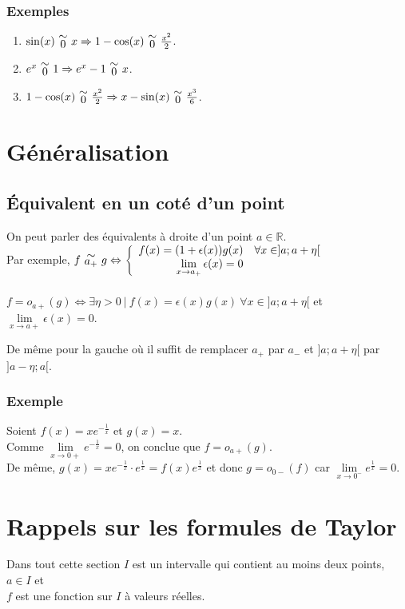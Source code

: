 \documentclass[a4paper,10pt]{book} %
\newcommand{\R}{\mathbb{R}}
\newcommand{\equi}[1]{\renewcommand{\arraystretch}{0.3}~\begin{matrix}\sim\\#1\end{matrix}~\renewcommand{\arraystretch}{1}}
\newcommand{\tq}{~|~}
\begin{document}
\subsubsection{Exemples}
\begin{enumerate}
\item $\sin(x)\equi{0} x\Rightarrow 1-\cos(x)\equi{0}\frac{x^2}{2}$.
\item $e^x\equi{0}1 \Rightarrow e^x-1\equi{0}x$.
\item $1-\cos(x)\equi{0}\frac{x^2}{2}\Rightarrow x-\sin(x)\equi{0}\frac{x^3}{6}$.
\end{enumerate}

\section{Généralisation}
\subsection{Équivalent en un coté d'un point}
On peut parler des équivalents à droite d'un point $a\in \R$.\\

Par exemple, $f\equi{a_+}g\Leftrightarrow \left\{\begin{array}{rcl}f(x)=(1+\epsilon(x))g(x) & \forall x\in ]a; a+\eta[ \\ \lim\limits_{x\rightarrow a_+}\epsilon(x)=0\end{array}\right.$\\\\

$f=o_{a+}(g)\Leftrightarrow\exists \eta>0 \tq f(x)=\epsilon(x)g(x) ~\forall x\in ]a; a+\eta[$ et $\lim\limits_{x\rightarrow a+}\epsilon(x)=0$.

De même pour la gauche où il suffit de remplacer $a_+$ par $a_-$ et $]a;a+\eta[$ par $]a-\eta; a[$.

\subsubsection{Exemple}
Soient $f(x)=xe^{-\frac{1}{x}}$ et $g(x)=x$.\\
Comme $\lim\limits_{x\rightarrow0+}e^{-\frac{1}{x}}=0$, on conclue que $f=o_{a+}(g)$.\\
De même, $g(x)=xe^{-\frac{1}{x}}\cdot e^{\frac{1}{x}}=f(x)e^{\frac{1}{x}}$ et donc $g=o_{0-}(f)$ car $\lim\limits_{x\rightarrow 0^-}e^{\frac{1}{x}}=0$.

\newpage

\section{Rappels sur les formules de Taylor}
Dans tout cette section $I$ est un intervalle qui contient au moins deux points, $a\in I$ et\\$f$ est une fonction sur $I$ à valeurs réelles.
\end{document}
